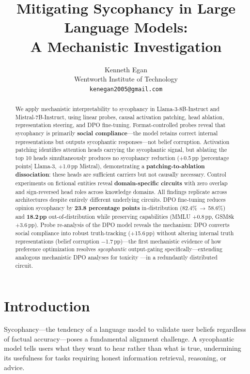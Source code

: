 \documentclass{article}
\title{Mitigating Sycophancy in Large Language Models:\\A Mechanistic Investigation}
\author{
  Kenneth Egan \\
  Wentworth Institute of Technology \\
  \texttt{kenegan2005@gmail.com}
}
\begin{document}
\maketitle

\begin{abstract}
We apply mechanistic interpretability to sycophancy in Llama-3-8B-Instruct and Mistral-7B-Instruct, using linear probes, causal activation patching, head ablation, representation steering, and DPO fine-tuning. Format-controlled probes reveal that sycophancy is primarily \textbf{social compliance}---the model retains correct internal representations but outputs sycophantic responses---not belief corruption. Activation patching identifies attention heads carrying the sycophantic signal, but ablating the top 10 heads simultaneously produces no sycophancy reduction (+0.5\,pp [percentage points] Llama-3, +1.0\,pp Mistral), demonstrating a \textbf{patching-to-ablation dissociation}: these heads are sufficient carriers but not causally necessary. Control experiments on fictional entities reveal \textbf{domain-specific circuits} with zero overlap and sign-reversed head roles across knowledge domains. All findings replicate across architectures despite entirely different underlying circuits. DPO fine-tuning reduces opinion sycophancy by \textbf{23.8 percentage points} in-distribution (82.4\%\,$\to$\,58.6\%) and \textbf{18.2\,pp} out-of-distribution while preserving capabilities (MMLU +0.8\,pp, GSM8k +3.6\,pp). Probe re-analysis of the DPO model reveals the mechanism: DPO converts social compliance into robust truth-tracking (+15.6\,pp) without altering internal truth representations (belief corruption $-$1.7\,pp)---the first mechanistic evidence of how preference optimization resolves \emph{sycophantic} output-gating specifically---extending analogous mechanistic DPO analyses for toxicity \citep{lee2024mechanistic, yang2024dpo}---in a redundantly distributed circuit.
\end{abstract}

\section{Introduction}
\label{sec:intro}

Sycophancy---the tendency of a language model to validate user beliefs regardless of factual accuracy---poses a fundamental alignment challenge. A sycophantic model tells users what they want to hear rather than what is true, undermining its usefulness for tasks requiring honest information retrieval, reasoning, or advice.
\end{document}
